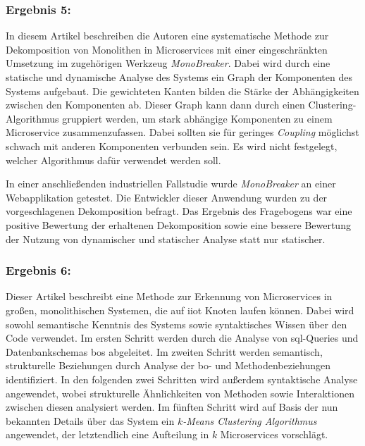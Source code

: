 \subsubsection{Ergebnis 5:  \cite{arh-result-no-filter-5}}

In diesem Artikel beschreiben die Autoren eine systematische Methode zur Dekomposition von Monolithen in Microservices mit einer eingeschränkten Umsetzung im zugehörigen Werkzeug \emph{MonoBreaker}.
Dabei wird durch eine statische und dynamische Analyse des Systems ein Graph der Komponenten des Systems aufgebaut.
Die gewichteten Kanten bilden die Stärke der Abhängigkeiten zwischen den Komponenten ab.
Dieser Graph kann dann durch einen Clustering-Algorithmus gruppiert werden, um stark abhängige Komponenten zu einem Microservice zusammenzufassen.
Dabei sollten sie für geringes \emph{Coupling} möglichst schwach mit anderen Komponenten verbunden sein. 
Es wird nicht festgelegt, welcher Algorithmus dafür verwendet werden soll.

In einer anschließenden industriellen Fallstudie wurde \emph{MonoBreaker} an einer Webapplikation getestet.
Die Entwickler dieser Anwendung wurden zu der vorgeschlagenen Dekomposition befragt.
Das Ergebnis des Fragebogens war eine positive Bewertung der erhaltenen Dekomposition sowie eine bessere Bewertung der Nutzung von dynamischer und statischer Analyse statt nur statischer.


\subsubsection{Ergebnis 6:  \cite{arh-result-important-filter-4}}

Dieser Artikel beschreibt eine Methode zur Erkennung von Microservices in großen, monolithischen Systemen, die auf \gls{iiot} Knoten laufen können.
Dabei wird sowohl semantische Kenntnis des Systems sowie syntaktisches Wissen über den Code verwendet.
Im ersten Schritt werden durch die Analyse von \gls{sql}-Queries und Datenbankschemas \glspl{bo} abgeleitet.
Im zweiten Schritt werden semantisch, strukturelle Beziehungen durch Analyse der \gls{bo}- und Methodenbeziehungen identifiziert.
In den folgenden zwei Schritten wird außerdem syntaktische Analyse angewendet, wobei strukturelle Ähnlichkeiten von Methoden sowie Interaktionen zwischen diesen analysiert werden.
Im fünften Schritt wird auf Basis der nun bekannten Details über das System ein \emph{$k$-Means Clustering Algorithmus} angewendet, der letztendlich eine Aufteilung in $k$ Microservices vorschlägt.

